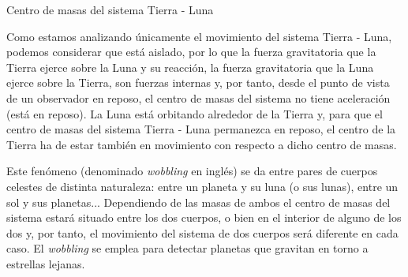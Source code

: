 \begin{myblock}{Centro de masas del sistema Tierra - Luna}
\begin{small}
\begin{multicols}{2}
\end{multicols}
Como estamos analizando únicamente el movimiento del sistema Tierra - Luna, podemos considerar que está aislado, por lo que la fuerza gravitatoria que la Tierra ejerce sobre la Luna y su reacción, la fuerza gravitatoria que la Luna ejerce sobre la Tierra, son fuerzas internas y, por tanto, desde el punto de vista de un observador en reposo, el centro de masas del sistema no tiene aceleración (está en reposo). La Luna está orbitando alrededor de la Tierra y, para que el centro de masas del sistema Tierra - Luna permanezca en reposo, el centro de la Tierra ha de estar también en movimiento con respecto a dicho centro de masas. 

\vspace{1mm} Este fenómeno (denominado \emph{wobbling} en inglés) se da entre pares de cuerpos celestes de distinta naturaleza: entre un planeta y su luna (o sus lunas), entre un sol y sus planetas... Dependiendo de las masas de ambos el centro de masas del sistema estará situado entre los dos cuerpos, o bien en el interior de alguno de los dos y, por tanto, el movimiento del sistema de dos cuerpos será diferente en cada caso. El \emph{wobbling} se emplea para detectar planetas que gravitan en torno a estrellas lejanas. 	
\end{small}
\end{myblock}











